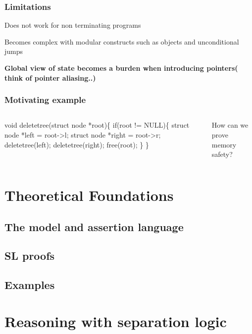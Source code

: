 \documentclass{beamer}
\begin{document}
    \begin{frame}
        \frametitle{Limitations}
        
        Does not work for non terminating programs 
        \pause    
        \bigskip
        
        Becomes complex with modular constructs such as objects and unconditional jumps
        \pause
        \bigskip

        \textbf{Global view of state becomes a burden when introducing pointers( think of pointer aliasing..)}

        
    \end{frame}
    \begin{frame}
        \frametitle{Motivating example}
        \begin{columns}
            \begin{column}{0.5\textwidth}
                void deletetree(struct node *root)\{
                            if(root != NULL)\{
                                struct node *left = root->l;
                                struct node *right = root->r;
                                deletetree(left);
                                deletetree(right);
                                free(root);
                            \}
                    \}   
            \end{column}
            \begin{column}{0.5\textwidth}
                How can we prove memory safety?
            \end{column}
        \end{columns}
    \end{frame}
    \section{Theoretical Foundations}
    \subsection{The model and assertion language}
    \subsection{SL proofs}
    \subsection{Examples}
    \section{Reasoning with separation logic}
\end{document}
